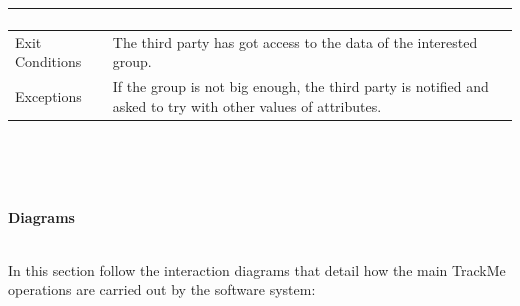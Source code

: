 \documentclass{article}
\begin{document}
\begin{legal}
\begin{legal}
\begin{legal}
\begin{tabular}{| m{3.5cm} | m{8cm}| }
\begin{enumerate}
				\end{enumerate}\\
				\hline
					Exit Conditions & The third party has got access to the data of the interested group.\\
				\hline
					Exceptions & If the group is not big enough, the third party is notified and asked to try with other values of attributes.\\
				\hline
				\end{tabular}
				\\\\\\
			\newpage
			\item \textbf {Diagrams}\\\\
			{\normalfont
			In this section follow the interaction diagrams that detail how the main TrackMe operations are carried out by the software system:\\
			
			\begin{legal}
			

\end{legal}}
\end{legal}
\end{legal}
\end{legal}
\end{document}
